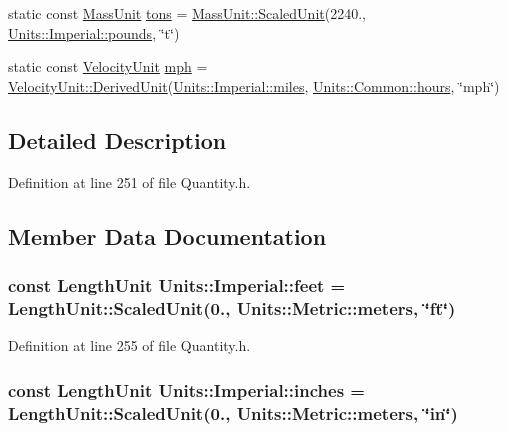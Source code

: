 \begin{DoxyCompactItemize}
\item 
static const \hyperlink{_quantity_8h_a2dde25127542e6a5fcf7c085269b8963}{Mass\+Unit} \hyperlink{class_units_1_1_imperial_aa704afada0bf66bfb942b92b880e425e}{tons} = \hyperlink{class_unit_aa44ac3044c0cdb834cd220652e5d1c40}{Mass\+Unit\+::\+Scaled\+Unit}(2240., \hyperlink{class_units_1_1_imperial_a25954e93175ecbf7c8dcc870e6c01dd4}{Units\+::\+Imperial\+::pounds}, \char`\"{}t\char`\"{})
\item 
static const \hyperlink{_quantity_8h_a4130b5cf107e9890a06c6c06bbfa7da3}{Velocity\+Unit} \hyperlink{class_units_1_1_imperial_aa16979886192a537b02c2421701c8e25}{mph} = \hyperlink{class_unit_a62b5aa1a4619ce98223eb728f91cf28d}{Velocity\+Unit\+::\+Derived\+Unit}(\hyperlink{class_units_1_1_imperial_a3ccc983d656c0b984f7b269d6e6c3625}{Units\+::\+Imperial\+::miles}, \hyperlink{class_units_1_1_common_a85905b04a8c1fa4058249d06c81828c7}{Units\+::\+Common\+::hours}, \char`\"{}mph\char`\"{})
\end{DoxyCompactItemize}


\subsection{Detailed Description}


Definition at line 251 of file Quantity.\+h.



\subsection{Member Data Documentation}
\hypertarget{class_units_1_1_imperial_aa9b2921928f73582aec2467ba60bb625}{
\subsubsection[{feet}]{\setlength{\rightskip}{0pt plus 5cm}const {\bf Length\+Unit} Units\+::\+Imperial\+::feet = {\bf Length\+Unit\+::\+Scaled\+Unit}(0., {\bf Units\+::\+Metric\+::meters}, \char`\"{}ft\char`\"{})\hspace{0.3cm}{\ttfamily [static]}}}\label{class_units_1_1_imperial_aa9b2921928f73582aec2467ba60bb625}


Definition at line 255 of file Quantity.\+h.

\hypertarget{class_units_1_1_imperial_ab94938e29c6ad2bfd28576401a580fc7}{
\subsubsection[{inches}]{\setlength{\rightskip}{0pt plus 5cm}const {\bf Length\+Unit} Units\+::\+Imperial\+::inches = {\bf Length\+Unit\+::\+Scaled\+Unit}(0., {\bf Units\+::\+Metric\+::meters}, \char`\"{}in\char`\"{})\hspace{0.3cm}{\ttfamily [static]}}}\label{class_units_1_1_imperial_ab94938e29c6ad2bfd28576401a580fc7}


